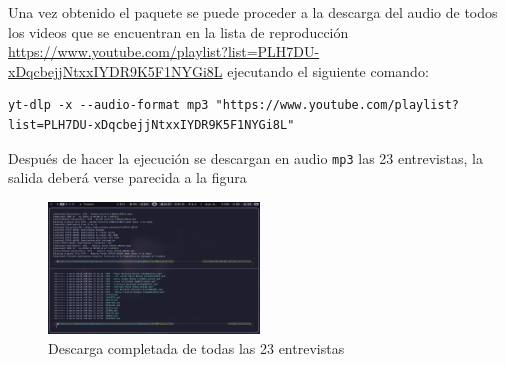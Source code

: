\documentclass{article}
\begin{document}
Una vez obtenido el paquete se puede proceder a la descarga del audio de todos los videos que se encuentran en la lista de reproducción \url{https://www.youtube.com/playlist?list=PLH7DU-xDqcbejjNtxxIYDR9K5F1NYGi8L} ejecutando el siguiente comando:

\begin{lstlisting}[style=bashstyle]
yt-dlp -x --audio-format mp3 "https://www.youtube.com/playlist?list=PLH7DU-xDqcbejjNtxxIYDR9K5F1NYGi8L" 
\end{lstlisting}

Después de hacer la ejecución se descargan en audio \texttt{mp3} las 23 entrevistas, la salida deberá verse parecida a la figura

\begin{figure}[ht]
  \centering
  \includegraphics[width=0.5\textwidth]{img/OutputYT.png}
  \caption{\label{fig:yt-dlp} Descarga completada de todas las 23 entrevistas}
\end{figure}







\end{document}
